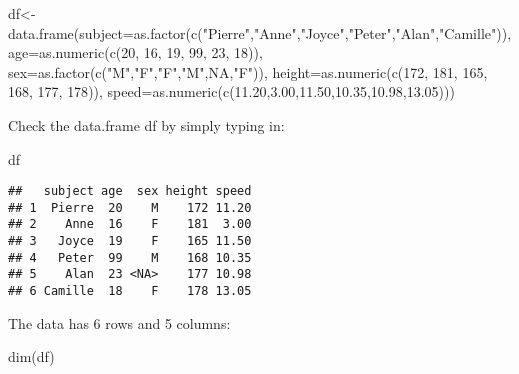 \documentclass[
]{article}
\newenvironment{Shaded}{\begin{snugshade}}{\end{snugshade}}
\newcommand{\AttributeTok}[1]{\textcolor[rgb]{0.77,0.63,0.00}{#1}}
\newcommand{\ConstantTok}[1]{\textcolor[rgb]{0.00,0.00,0.00}{#1}}
\newcommand{\DecValTok}[1]{\textcolor[rgb]{0.00,0.00,0.81}{#1}}
\newcommand{\FloatTok}[1]{\textcolor[rgb]{0.00,0.00,0.81}{#1}}
\newcommand{\FunctionTok}[1]{\textcolor[rgb]{0.00,0.00,0.00}{#1}}
\newcommand{\NormalTok}[1]{#1}
\newcommand{\OtherTok}[1]{\textcolor[rgb]{0.56,0.35,0.01}{#1}}
\newcommand{\StringTok}[1]{\textcolor[rgb]{0.31,0.60,0.02}{#1}}
\begin{document}
\begin{Shaded}
\begin{Highlighting}[]
\NormalTok{df}\OtherTok{\textless{}{-}}\FunctionTok{data.frame}\NormalTok{(}\AttributeTok{subject=}\FunctionTok{as.factor}\NormalTok{(}\FunctionTok{c}\NormalTok{(}\StringTok{"Pierre"}\NormalTok{,}\StringTok{"Anne"}\NormalTok{,}\StringTok{"Joyce"}\NormalTok{,}\StringTok{"Peter"}\NormalTok{,}\StringTok{"Alan"}\NormalTok{,}\StringTok{"Camille"}\NormalTok{)), }\AttributeTok{age=}\FunctionTok{as.numeric}\NormalTok{(}\FunctionTok{c}\NormalTok{(}\DecValTok{20}\NormalTok{, }\DecValTok{16}\NormalTok{, }\DecValTok{19}\NormalTok{, }\DecValTok{99}\NormalTok{, }\DecValTok{23}\NormalTok{, }\DecValTok{18}\NormalTok{)), }\AttributeTok{sex=}\FunctionTok{as.factor}\NormalTok{(}\FunctionTok{c}\NormalTok{(}\StringTok{"M"}\NormalTok{,}\StringTok{"F"}\NormalTok{,}\StringTok{"F"}\NormalTok{,}\StringTok{"M"}\NormalTok{,}\ConstantTok{NA}\NormalTok{,}\StringTok{"F"}\NormalTok{)), }\AttributeTok{height=}\FunctionTok{as.numeric}\NormalTok{(}\FunctionTok{c}\NormalTok{(}\DecValTok{172}\NormalTok{, }\DecValTok{181}\NormalTok{, }\DecValTok{165}\NormalTok{, }\DecValTok{168}\NormalTok{, }\DecValTok{177}\NormalTok{, }\DecValTok{178}\NormalTok{)), }\AttributeTok{speed=}\FunctionTok{as.numeric}\NormalTok{(}\FunctionTok{c}\NormalTok{(}\FloatTok{11.20}\NormalTok{,}\FloatTok{3.00}\NormalTok{,}\FloatTok{11.50}\NormalTok{,}\FloatTok{10.35}\NormalTok{,}\FloatTok{10.98}\NormalTok{,}\FloatTok{13.05}\NormalTok{)))}
\end{Highlighting}
\end{Shaded}

Check the data.frame df by simply typing in:

\begin{Shaded}
\begin{Highlighting}[]
\NormalTok{df}
\end{Highlighting}
\end{Shaded}

\begin{verbatim}
##   subject age  sex height speed
## 1  Pierre  20    M    172 11.20
## 2    Anne  16    F    181  3.00
## 3   Joyce  19    F    165 11.50
## 4   Peter  99    M    168 10.35
## 5    Alan  23 <NA>    177 10.98
## 6 Camille  18    F    178 13.05
\end{verbatim}

The data has 6 rows and 5 columns:

\begin{Shaded}
\begin{Highlighting}[]
\FunctionTok{dim}\NormalTok{(df)}
\end{Highlighting}
\end{Shaded}
\end{document}
